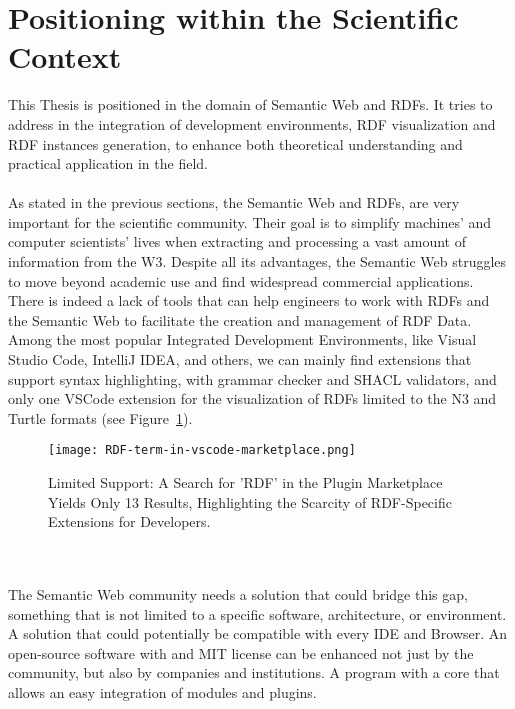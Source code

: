 \section{Positioning within the Scientific Context \label{sec:scope}}
This Thesis is positioned in the domain of Semantic Web and RDFs. It tries to address in the integration of development environments, RDF visualization and RDF instances generation, to enhance both theoretical understanding and practical application in the field.
\\
\\
As stated in the previous sections, the Semantic Web and RDFs, are very important for the scientific community. Their goal is to simplify machines' and computer scientists' lives when extracting and processing a vast amount of information from the W3.
Despite all its advantages, the Semantic Web struggles to move beyond academic use and find widespread commercial applications. 
There is indeed a lack of tools that can help engineers to work with RDFs and the Semantic Web to facilitate the creation and management of RDF Data. 
Among the most popular Integrated Development Environments, like Visual Studio Code, IntelliJ IDEA, and others, we can mainly find extensions that support syntax highlighting, with grammar checker and SHACL validators, and only one VSCode extension for the visualization of RDFs limited to the N3 and Turtle formats \cite{vscode_rdf_plugin,jetbrains_rdf_plugin,stackoverflow_survey_2024} (see Figure~\ref{fig:RDF-term-in-vscode-marketplace}).
\begin{figure}[htb]
  \centering
  \texttt{[image: RDF-term-in-vscode-marketplace.png]}\\
  \caption{Limited Support: A Search for 'RDF' in the Plugin Marketplace Yields Only 13 Results, Highlighting the Scarcity of RDF-Specific Extensions for Developers.}\label{fig:RDF-term-in-vscode-marketplace}
\end{figure}
\\
\\
The Semantic Web community needs a solution that could bridge this gap, something that is not limited to a specific software, architecture, or environment. A solution that could potentially be compatible with every IDE and Browser. An open-source software with and MIT license can be enhanced not just by the community, but also by companies and institutions.
A program with a core that allows an easy integration of modules and plugins. 
\\
\\
